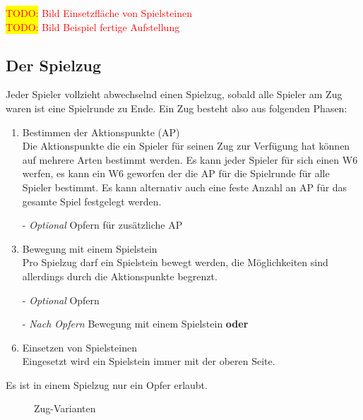 \documentclass{article}
\newcommand{\todo}[1]{\textcolor{red}{\colorbox{yellow}{TODO:} #1\\}}
\begin{document}
	\todo{Bild Einsetzfläche von Spielsteinen}
	\todo{Bild Beispiel fertige Aufstellung}
	
\subsection{Der Spielzug}

	
	Jeder Spieler vollzieht abwechselnd einen Spielzug, sobald alle Spieler am Zug waren
	ist eine Spielrunde zu Ende. Ein Zug besteht also aus folgenden Phasen:

	
	
	\begin{enumerate}
	\item Bestimmen der Aktionspunkte (AP) \\
		  Die Aktionspunkte die ein Spieler für seinen Zug zur Verfügung hat können auf mehrere Arten bestimmt werden.
		  Es kann jeder Spieler für sich einen W6 werfen, es kann ein W6 geworfen der die AP für die Spielrunde für alle Spieler bestimmt.
		  Es kann alternativ auch eine feste Anzahl an AP für das gesamte Spiel festgelegt werden.

	\item[-] \textit{Optional} Opfern für zusätzliche AP
		  
	\item Bewegung mit einem Spielstein \\
		  Pro Spielzug darf ein Spielstein bewegt werden, die Möglichkeiten sind allerdings durch die Aktionspunkte begrenzt.
	
	\item[-] \textit{Optional}  Opfern
	
	\item[-] \textit{Nach Opfern} Bewegung mit einem Spielstein \textbf{oder} 
			  
	\item Einsetzen von Spielsteinen \\
		  Eingesetzt wird ein Spielstein immer mit der oberen Seite.
		  
	\end{enumerate}
	
	Es ist in einem Spielzug nur ein Opfer erlaubt.
	
	\begin{wrapfigure}{l}{6.2cm}
  	\caption{Zug-Varianten}
	\end{wrapfigure}
	
\end{document}
